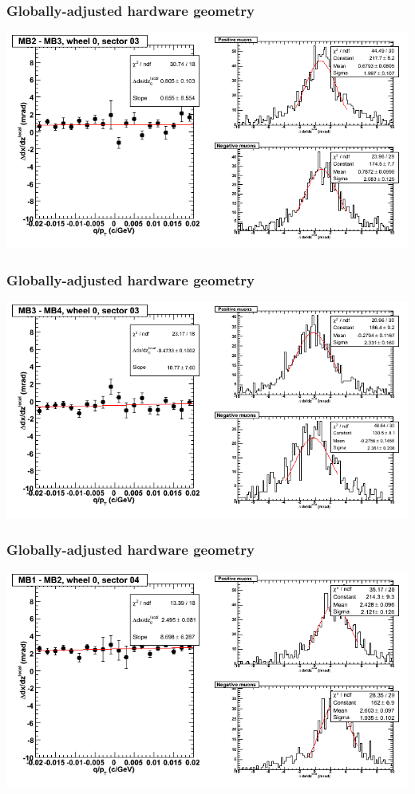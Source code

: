 \documentclass[compress]{beamer}
\begin{document}
\begin{frame}
\frametitle{Globally-adjusted hardware geometry}
\includegraphics[width=\linewidth]{NOV4_segdiffs_HW/dt13_slope_C_03_23.png}
\end{frame}

\begin{frame}
\frametitle{Globally-adjusted hardware geometry}
\includegraphics[width=\linewidth]{NOV4_segdiffs_HW/dt13_slope_C_03_34.png}
\end{frame}

\begin{frame}
\frametitle{Globally-adjusted hardware geometry}
\includegraphics[width=\linewidth]{NOV4_segdiffs_HW/dt13_slope_C_04_12.png}
\end{frame}
\end{document}
